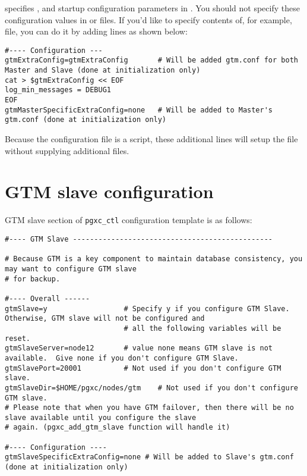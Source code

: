        specifies ,  and  startup
	  configuration parameters in .
      You should not specify these configuration values in  or
	   files.
      If you'd like to specify contents of, for example,  file, you can
	  do it by adding lines as shown below:
      
      \begin{lstlisting}[frame=single, basicstyle=\ttfamily\tiny]
#---- Configuration ---
gtmExtraConfig=gtmExtraConfig       # Will be added gtm.conf for both Master and Slave (done at initialization only)
cat > $gtmExtraConfig << EOF
log_min_messages = DEBUG1
EOF
gtmMasterSpecificExtraConfig=none   # Will be added to Master's gtm.conf (done at initialization only)
	  \end{lstlisting}

	  Because the configuration file is a  script,  these additional lines will setup the file
	  without supplying additional files.



\section{GTM slave configuration}

	GTM slave section of \verb|pgxc_ctl| configuration template is as follows:

	\begin{lstlisting}[frame=single]
#---- GTM Slave -----------------------------------------------

# Because GTM is a key component to maintain database consistency, you may want to configure GTM slave
# for backup.

#---- Overall ------
gtmSlave=y                  # Specify y if you configure GTM Slave.   Otherwise, GTM slave will not be configured and
                            # all the following variables will be reset.
gtmSlaveServer=node12       # value none means GTM slave is not available.  Give none if you don't configure GTM Slave.
gtmSlavePort=20001          # Not used if you don't configure GTM slave.
gtmSlaveDir=$HOME/pgxc/nodes/gtm    # Not used if you don't configure GTM slave.
# Please note that when you have GTM failover, then there will be no slave available until you configure the slave
# again. (pgxc_add_gtm_slave function will handle it)

#---- Configuration ----
gtmSlaveSpecificExtraConfig=none # Will be added to Slave's gtm.conf (done at initialization only)
	\end{lstlisting}

